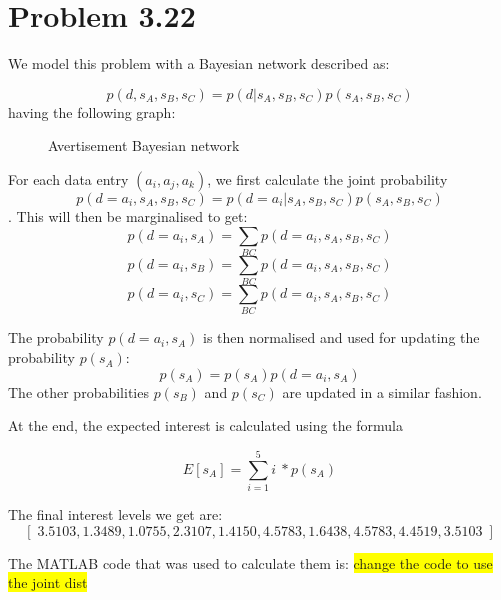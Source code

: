 \documentclass[11pt,a4paper,oneside]{report}
\newcommand{\hilight}[1]{\colorbox{yellow}{#1}}
\begin{document}
\section*{Problem 3.22}

We model this problem with a Bayesian network described as:

$$p(d, s_A, s_B, s_C) = p(d | s_A, s_B, s_C) p(s_A, s_B, s_C)$$ having the 
following graph: 

\begin{figure}[H]
  \centering
    \caption{Avertisement Bayesian network}
    \label{fig:daily_fail}    
\end{figure}

For each data entry $(a_i, a_j, a_k)$, we first calculate the joint probability
$$p(d = a_i, s_A, s_B, s_C) = p(d = a_i | s_A, s_B, s_C)p(s_A, s_B, s_C)$$. 
This will then be marginalised to get: 
$$ p(d = a_i, s_A) = \sum_{BC}p(d = a_i, s_A, s_B, s_C) $$
$$ p(d = a_i, s_B) = \sum_{BC}p(d = a_i, s_A, s_B, s_C) $$
$$ p(d = a_i, s_C) = \sum_{BC}p(d = a_i, s_A, s_B, s_C) $$

The probability $p(d = a_i, s_A)$ is then normalised and used for updating the 
probability $p(s_A)$:
$$p(s_A) = p(s_A)p(d = a_i, s_A)$$
The other probabilities $p(s_B)$ and $p(s_C)$ are updated in a similar fashion. 

At the end, the expected interest is calculated using the formula

$$E[s_A] = \sum_{i=1}^{5}i\ * p(s_A)$$

The final interest levels we get are:
$$\left[\; 3.5103, 1.3489, 1.0755, 2.3107, 1.4150, 4.5783, 1.6438, 4.5783, 
4.4519, 3.5103\; \right]$$

The MATLAB code that was used to calculate them is:
\hilight{change the code to use the joint dist}
\end{document}
